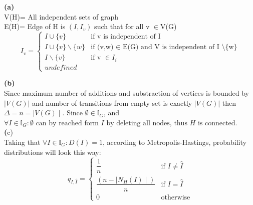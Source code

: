 \textbf{(a)}\\
 V(H)= All independent sets of graph \\
E(H)= Edge of H is $(I,I_{v})$ such that for all v $\in $V(G)  \\
\[
  I_{v} =
  \begin{cases}
                                   I \cup \{v\} & \text{if v is independent of I} \\
                                   I \cup \{v\} \backslash \{w\} & \text{if (v,w) $\in$ E(G) and V is independent of  I \textbackslash \{w\}} \\
  				I \backslash \{v\}  & \text{if v $\in I_{i}$ }\\
				undefined 
  \end{cases}
\]



\textbf{(b)}\\ Since maximum number of additions and substraction of vertices is bounded by $|V(G)|$ 
and number of transitions from empty set is exactly $|V(G)|$  then $\Delta = n = \mid V(G) \mid $. 
Since $\emptyset \in \mathbb{I}_{G}$, and 
$\forall I \in \mathbb{I}_G : \emptyset \text{ can by reached form $I$ by deleting all nodes, thus $H$ is connected}$. \\

\textbf(c)\\
Taking that $\forall I\in \mathbb{I}_G: D(I) = 1$, according to Metropolis-Hastings, probability distributions will look this way: \\
\[
 q_{I,\hat{I}} =
  \begin{cases}
                                   \dfrac{1}{n} & \text{if $I \neq \hat{I}$} \\
                                   \dfrac{(n- \mid N_{H}(I)\mid)} {n} & \text{if $I = \hat{I}$} \\
  			0  & \text{otherwise}
  \end{cases}
\]
